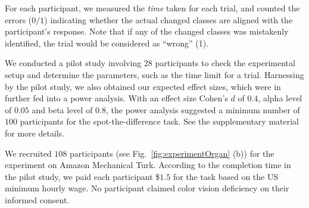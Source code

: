 {\vspace{.3em}
For each participant, we measured the \emph{time} taken for each trial, and counted the errors ($0/1$) indicating whether the actual changed classes are aligned with the participant's response. Note that if any of the changed classes was mistakenly identified, the trial would be considered as ``wrong'' (1).





\vspace{.3em}
We conducted a pilot study involving 28 participants to check the experimental setup and determine the parameters, such as the time limit for a trial.
Harnessing by the pilot study, we also obtained our expected effect sizes, which were in further fed into a power analysis. With an effect size Cohen's $d$ of $0.4$, alpha level of $0.05$ and beta level of $0.8$, the power analysis suggested a minimum number of $100$ participants for the spot-the-difference task. See the supplementary material for more details.


\vspace{.3em}
We recruited $108$ participants (see Fig.~\ref{fig:experimentOrgan} (b)) for the experiment on Amazon Mechanical Turk.
According to the completion time in the pilot study, we paid each participant \$$1.5$ for the task based on the US minimum hourly wage.
No participant claimed color vision deficiency on their informed consent.

}
